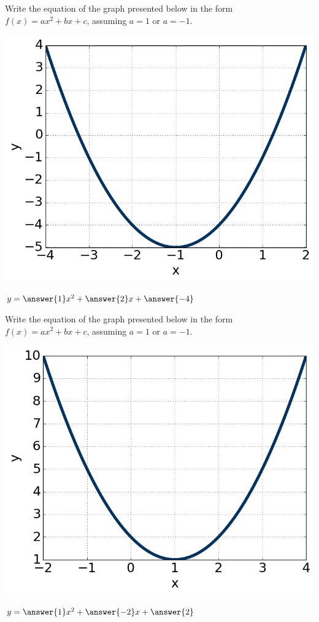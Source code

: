 \documentclass{ximera}
\begin{document}
\begin{question}
Write the equation of the graph presented below in the form $f(x)=ax^2+bx+c$, assuming $a=1$ or $a=-1$. 

\begin{center}
	\includegraphics{question1Bstatic.png}
\end{center}

$y = \answer{1} x^2 + \answer{2} x + \answer{-4}$
\end{question}

\begin{question}
Write the equation of the graph presented below in the form $f(x)=ax^2+bx+c$, assuming $a=1$ or $a=-1$. 

\begin{center}
	\includegraphics{question1Cstatic.png}
\end{center}

$y = \answer{1} x^2 + \answer{-2} x + \answer{2}$
\end{question}
\end{document}
